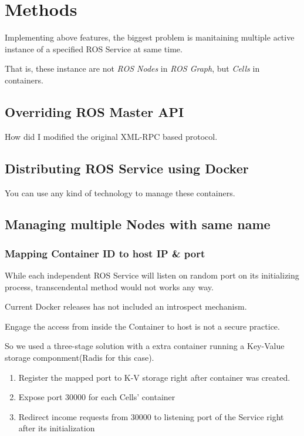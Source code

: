 \section{Methods}

Implementing above features, the biggest problem is manitaining multiple active instance of a specified ROS Service at same time.

That is, these instance are not \emph{ROS Nodes} in \emph{ROS Graph}, but \emph{Cells} in containers.

\subsection{Overriding ROS Master API}
How did I modified the original XML-RPC based protocol.

\subsection{Distributing ROS Service using Docker}
You can use any kind of technology to manage these containers.

\subsection{Managing multiple Nodes with same name}
\subsubsection{Mapping Container ID to host IP \& port}
While each independent ROS Service will listen on random port on its initializing process, transcendental method would not works any way. 

Current Docker releases has not included an introspect mechanism.

Engage the access from inside the Container to host is not a secure practice.

So we used a three-stage solution with a extra container running a Key-Value storage componment(Radis for this case).
\begin{enumerate}
    \item Register the mapped port to K-V storage right after container was created.
    \item Expose port 30000 for each Cells' container
    \item Redirect income requests from 30000 to listening port of the Service right after its initialization
\end{enumerate}

